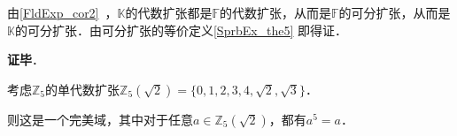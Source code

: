 












由\autoref{FldExp_cor2}~，$\mathbb{K}$的代数扩张都是$\mathbb{F}$的代数扩张，从而是$\mathbb{F}$的可分扩张，从而是$\mathbb{K}$的可分扩张．由可分扩张的等价定义\autoref{SprbEx_the5} 即得证．


\textbf{证毕}．


\begin{example}{}\label{SprbEx_ex3}
考虑$\mathbb{Z}_5$的单代数扩张$\mathbb{Z}_5(\sqrt{2})=\{0, 1, 2, 3, 4, \sqrt{2}, \sqrt{3}\}$．

则这是一个完美域，其中对于任意$a\in\mathbb{Z}_5(\sqrt{2})$，都有$a^5=a$．
\end{example}









































